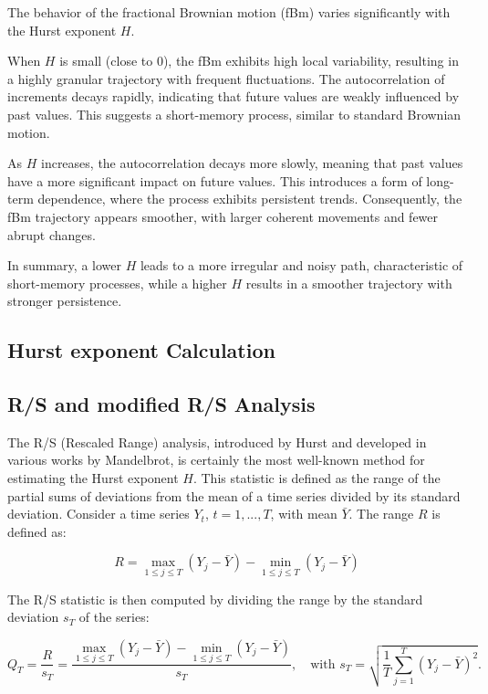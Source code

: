 \documentclass[11pt]{extarticle}
\begin{document}
\FloatBarrier

The behavior of the fractional Brownian motion (fBm) varies significantly with the Hurst exponent \( H \).

When \( H \) is small (close to 0), the fBm exhibits high local variability, resulting in a highly granular trajectory with frequent fluctuations. The autocorrelation of increments decays rapidly, indicating that future values are weakly influenced by past values. This suggests a short-memory process, similar to standard Brownian motion.

As \( H \) increases, the autocorrelation decays more slowly, meaning that past values have a more significant impact on future values. This introduces a form of long-term dependence, where the process exhibits persistent trends. Consequently, the fBm trajectory appears smoother, with larger coherent movements and fewer abrupt changes.

In summary, a lower \( H \) leads to a more irregular and noisy path, characteristic of short-memory processes, while a higher \( H \) results in a smoother trajectory with stronger persistence.

\subsection{Hurst exponent Calculation}
\subsection{R/S and modified R/S Analysis}
The R/S (Rescaled Range) analysis, introduced by Hurst and developed in various works by Mandelbrot, is certainly the most well-known method for estimating the Hurst exponent $H$. This statistic is defined as the range of the partial sums of deviations from the mean of a time series divided by its standard deviation. Consider a time series $Y_t$, $t = 1, ..., T$, with mean $\bar{Y}$. The range $R$ is defined as:

\[
R = \max_{1 \leq j \leq T} \left( Y_j - \bar{Y} \right) - \min_{1 \leq j \leq T} \left( Y_j - \bar{Y} \right)
\]

The R/S statistic is then computed by dividing the range by the standard deviation $s_T$ of the series:

\[
Q_T = \frac{R}{s_T} = \frac{\max_{1 \leq j \leq T} \left( Y_j - \bar{Y} \right) - \min_{1 \leq j \leq T} \left( Y_j - \bar{Y} \right)}{s_T}, \quad \text{with } s_T = \sqrt{\frac{1}{T} \sum_{j=1}^{T} \left( Y_j - \bar{Y} \right)^2}.
\]
\end{document}
